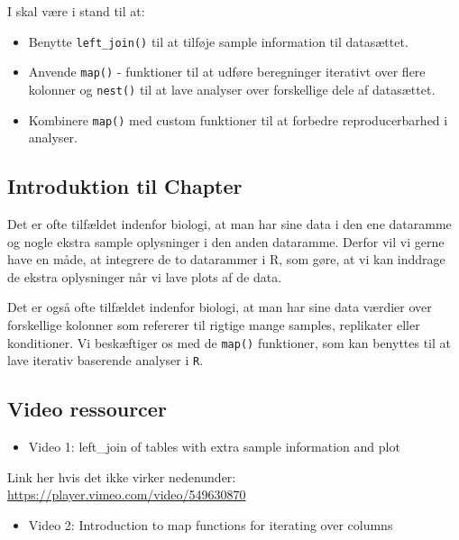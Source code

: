 \documentclass[
]{book}
\providecommand{\tightlist}{%
  \setlength{\itemsep}{0pt}\setlength{\parskip}{0pt}}
\begin{document}
I skal være i stand til at:

\begin{itemize}
\tightlist
\item
  Benytte \texttt{left\_join()} til at tilføje sample information til datasættet.
\item
  Anvende \texttt{map()} - funktioner til at udføre beregninger iterativt over flere kolonner og \texttt{nest()} til at lave analyser over forskellige dele af datasættet.
\item
  Kombinere \texttt{map()} med custom funktioner til at forbedre reproducerbarhed i analyser.
\end{itemize}

\hypertarget{introduktion-til-chapter}{%
\subsection{Introduktion til Chapter}\label{introduktion-til-chapter}}

Det er ofte tilfældet indenfor biologi, at man har sine data i den ene dataramme og nogle ekstra sample oplysninger i den anden dataramme. Derfor vil vi gerne have en måde, at integrere de to datarammer i R, som gøre, at vi kan inddrage de ekstra oplysninger når vi lave plots af de data.

Det er også ofte tilfældet indenfor biologi, at man har sine data værdier over forskellige kolonner som refererer til rigtige mange samples, replikater eller konditioner. Vi beskæftiger os med de \texttt{map()} funktioner, som kan benyttes til at lave iterativ baserende analyser i \texttt{R}.

\hypertarget{video-ressourcer-3}{%
\subsection{Video ressourcer}\label{video-ressourcer-3}}

\begin{itemize}
\tightlist
\item
  Video 1: left\_join of tables with extra sample information and plot
\end{itemize}

Link her hvis det ikke virker nedenunder: \url{https://player.vimeo.com/video/549630870}

\begin{itemize}
\tightlist
\item
  Video 2: Introduction to map functions for iterating over columns
\end{itemize}
\end{document}
